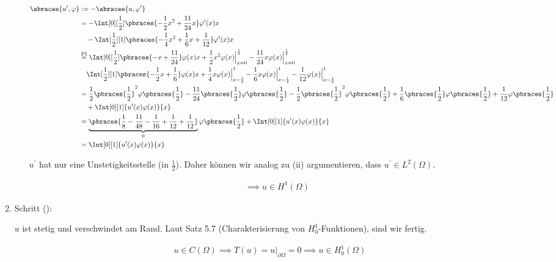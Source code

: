 \begin{solution}
\begin{enumerate}[label = \arabic*.]
\begin{enumerate}[label = (\roman*)]
    \begin{align*}
      \abraces{u^\prime, \varphi}
      & :=
      -\abraces{u, \varphi^\prime} \\
      & =
      -\Int[0][\frac{1}{2}]{\pbraces{-\frac{1}{2} x^2 + \frac{11}{24} x} \varphi^\prime(x)}{x} \\
      & \quad
      -\Int[\frac{1}{2}][1]{\pbraces{-\frac{1}{4} x^2 + \frac{1}{6} x + \frac{1}{12}} \varphi^\prime(x)}{x} \\
      & \stackrel
      {
        \mathrm{PI}
      }{=}
      \Int[0][\frac{1}{2}]{\pbraces{-x + \frac{11}{24}} \varphi(x)}{x}
      +
      \frac{1}{2} x^2 \varphi(x) \Big |_{x=0}^{\frac{1}{2}}
      -
      \frac{11}{24} x \varphi(x) \Big |_{x=0}^{\frac{1}{2}} \\
      & \quad
      \Int[\frac{1}{2}][1]{\pbraces{-\frac{1}{2} x + \frac{1}{6}} \varphi(x)}{x}
      +
      \frac{1}{4} x \varphi(x) \Big |_{x=\frac{1}{2}}^1
      -
      \frac{1}{6} x \varphi(x) \Big |_{x=\frac{1}{2}}^1
      -
      \frac{1}{12} \varphi(x) \Big |_{x=\frac{1}{2}}^1 \\
      & =
      \frac{1}{2} \pbraces{\frac{1}{2}}^2 \varphi \pbraces{\frac{1}{2}} - \frac{11}{24} \pbraces{\frac{1}{2}} \varphi \pbraces{\frac{1}{2}}
      -
      \frac{1}{2} \pbraces{\frac{1}{2}}^2 \varphi \pbraces{\frac{1}{2}} + \frac{1}{6} \pbraces{\frac{1}{2}} \varphi \pbraces{\frac{1}{2}} + \frac{1}{12} \varphi \pbraces{\frac{1}{2}} \\
      & \quad
      +
      \Int[0][1]{u^\prime(x) \varphi(x)}{x} \\
      & =
      \underbrace
      {
        \pbraces
        {
          \frac{1}{8} - \frac{11}{48} - \frac{1}{16} + \frac{1}{12} + \frac{1}{12}
        }
      }_0
      \varphi \pbraces{\frac{1}{2}}
      +
      \Int[0][1]{u^\prime(x) \varphi(x)}{x} \\
      & =
      \Int[0][1]{u^\prime(x) \varphi(x)}{x}
    \end{align*}

    $u^\prime$ hat nur eine Unstetigkeitsstelle (in $\frac{1}{2}$).
    Daher können wir analog zu (ii) argumentieren, dass $u^\prime \in L^2(\Omega)$.

    \begin{align*}
      \implies
      u \in H^1(\Omega)
    \end{align*}

  \end{enumerate}

  \item Schritt ():

  $u$ ist stetig und verschwindet am Rand.
  Laut Satz 5.7 (Charakterisierung von $H_0^1$-Funktionen), sind wir fertig.

  \begin{align*}
    u \in C(\Omega)
    \implies
    T(u) = u |_{\partial \Omega} = 0
    \implies
    u \in H_0^1(\Omega)
  \end{align*}

\end{enumerate}

\end{solution}

